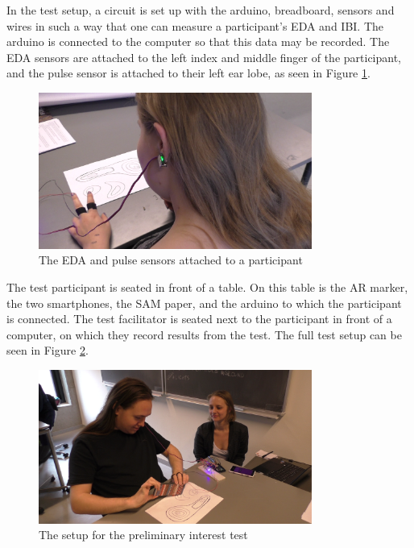 In the test setup, a circuit is set up with the arduino, breadboard, sensors and wires in such a way that one can measure a participant’s EDA and IBI. The arduino is connected to the computer so that this data may be recorded. The EDA sensors are attached to the left index and middle finger of the participant, and the pulse sensor is attached to their left ear lobe, as seen in Figure \ref{fig:pretest_ear}.

\begin{figure}[h!]
    \centering
    \includegraphics[width=0.8\textwidth]{figures/pretest_ear.png}
    \caption{The EDA and pulse sensors attached to a participant}\label{fig:pretest_ear}
\end{figure}

The test participant is seated in front of a table. On this table is the AR marker, the two smartphones, the SAM paper, and the arduino to which the participant is connected. The test facilitator is seated next to the participant in front of a computer, on which they record results from the test. The full test setup can be seen in Figure \ref{fig:pretest_setup}.

\begin{figure}[h!]
    \centering
    \includegraphics[width=0.8\textwidth]{figures/pretest_setup.png}
    \caption{The setup for the preliminary interest test}\label{fig:pretest_setup}
\end{figure}


